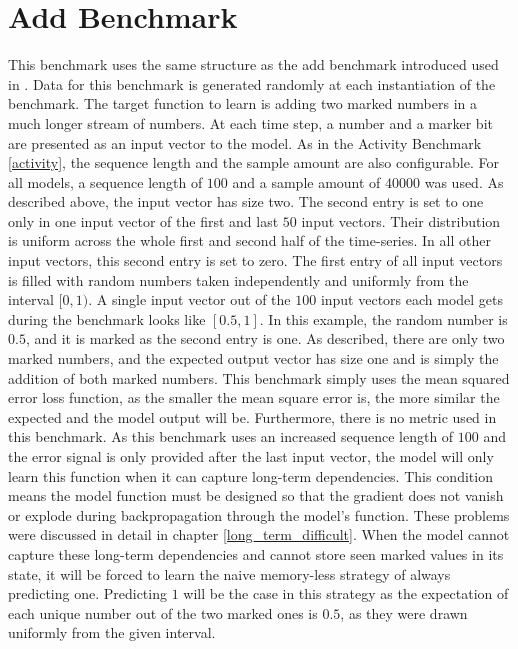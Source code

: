 \documentclass[draft,final]{vutinfth} %
\begin{document}
    \section{Add Benchmark} \label{add}
    This benchmark uses the same structure as the add benchmark introduced used in \cite{UnitaryRNNs}.
    Data for this benchmark is generated randomly at each instantiation of the benchmark.
    The target function to learn is adding two marked numbers in a much longer stream of numbers.
    At each time step, a number and a marker bit are presented as an input vector to the model.
    As in the Activity Benchmark \ref{activity}, the sequence length and the sample amount are also configurable.
    For all models, a sequence length of $100$ and a sample amount of $40000$ was used.
    As described above, the input vector has size two.
    The second entry is set to one only in one input vector of the first and last $50$ input vectors.
    Their distribution is uniform across the whole first and second half of the time-series.
    In all other input vectors, this second entry is set to zero.
    The first entry of all input vectors is filled with random numbers taken independently and uniformly from the interval $[0,1)$.
    A single input vector out of the $100$ input vectors each model gets during the benchmark looks like $[0.5,1]$.
    In this example, the random number is $0.5$, and it is marked as the second entry is one.
    As described, there are only two marked numbers, and the expected output vector has size one and is simply the addition of both marked numbers.
    This benchmark simply uses the mean squared error loss function, as the smaller the mean square error is, the more similar the expected and the model output will be.
    Furthermore, there is no metric used in this benchmark.
    As this benchmark uses an increased sequence length of $100$ and the error signal is only provided after the last input vector, the model will only learn this function when it can capture long-term dependencies.
    This condition means the model function must be designed so that the gradient does not vanish or explode during backpropagation through the model's function.
    These problems were discussed in detail in chapter \ref{long_term_difficult}.
    When the model cannot capture these long-term dependencies and cannot store seen marked values in its state, it will be forced to learn the naive memory-less strategy of always predicting one.
    Predicting $1$ will be the case in this strategy as the expectation of each unique number out of the two marked ones is $0.5$, as they were drawn uniformly from the given interval.
\end{document}

